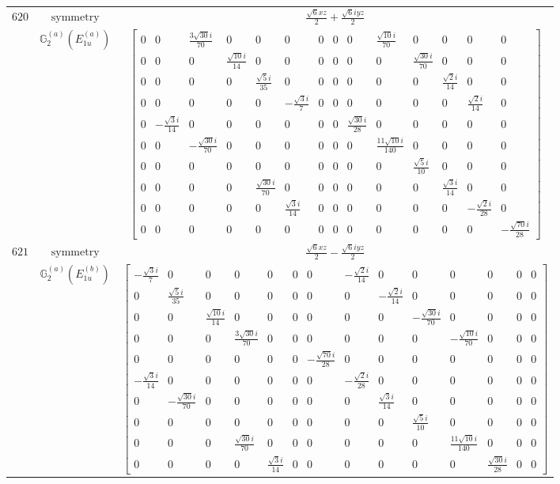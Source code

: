 \documentclass[fleqn,8pt,landscape]{jsarticle}
\begin{document}
\begin{longtable}{ccc}
$ 620 $ & $ \text{symmetry} $ & $ \frac{\sqrt{6} x z}{2} + \frac{\sqrt{6} i y z}{2} $ \\
$  $ & $ \mathbb{G}_{2}^{(a)}(E_{1u}^{(a)}) $ & $ \begin{bmatrix} 0 & 0 & \frac{3 \sqrt{30} i}{70} & 0 & 0 & 0 & 0 & 0 & 0 & \frac{\sqrt{10} i}{70} & 0 & 0 & 0 & 0 \\ 0 & 0 & 0 & \frac{\sqrt{10} i}{14} & 0 & 0 & 0 & 0 & 0 & 0 & \frac{\sqrt{30} i}{70} & 0 & 0 & 0 \\ 0 & 0 & 0 & 0 & \frac{\sqrt{5} i}{35} & 0 & 0 & 0 & 0 & 0 & 0 & \frac{\sqrt{2} i}{14} & 0 & 0 \\ 0 & 0 & 0 & 0 & 0 & - \frac{\sqrt{3} i}{7} & 0 & 0 & 0 & 0 & 0 & 0 & \frac{\sqrt{2} i}{14} & 0 \\ 0 & - \frac{\sqrt{3} i}{14} & 0 & 0 & 0 & 0 & 0 & 0 & \frac{\sqrt{30} i}{28} & 0 & 0 & 0 & 0 & 0 \\ 0 & 0 & - \frac{\sqrt{30} i}{70} & 0 & 0 & 0 & 0 & 0 & 0 & \frac{11 \sqrt{10} i}{140} & 0 & 0 & 0 & 0 \\ 0 & 0 & 0 & 0 & 0 & 0 & 0 & 0 & 0 & 0 & \frac{\sqrt{5} i}{10} & 0 & 0 & 0 \\ 0 & 0 & 0 & 0 & \frac{\sqrt{30} i}{70} & 0 & 0 & 0 & 0 & 0 & 0 & \frac{\sqrt{3} i}{14} & 0 & 0 \\ 0 & 0 & 0 & 0 & 0 & \frac{\sqrt{3} i}{14} & 0 & 0 & 0 & 0 & 0 & 0 & - \frac{\sqrt{2} i}{28} & 0 \\ 0 & 0 & 0 & 0 & 0 & 0 & 0 & 0 & 0 & 0 & 0 & 0 & 0 & - \frac{\sqrt{70} i}{28} \end{bmatrix} $ \\ \hline
$ 621 $ & $ \text{symmetry} $ & $ \frac{\sqrt{6} x z}{2} - \frac{\sqrt{6} i y z}{2} $ \\
$  $ & $ \mathbb{G}_{2}^{(a)}(E_{1u}^{(b)}) $ & $ \begin{bmatrix} - \frac{\sqrt{3} i}{7} & 0 & 0 & 0 & 0 & 0 & 0 & - \frac{\sqrt{2} i}{14} & 0 & 0 & 0 & 0 & 0 & 0 \\ 0 & \frac{\sqrt{5} i}{35} & 0 & 0 & 0 & 0 & 0 & 0 & - \frac{\sqrt{2} i}{14} & 0 & 0 & 0 & 0 & 0 \\ 0 & 0 & \frac{\sqrt{10} i}{14} & 0 & 0 & 0 & 0 & 0 & 0 & - \frac{\sqrt{30} i}{70} & 0 & 0 & 0 & 0 \\ 0 & 0 & 0 & \frac{3 \sqrt{30} i}{70} & 0 & 0 & 0 & 0 & 0 & 0 & - \frac{\sqrt{10} i}{70} & 0 & 0 & 0 \\ 0 & 0 & 0 & 0 & 0 & 0 & - \frac{\sqrt{70} i}{28} & 0 & 0 & 0 & 0 & 0 & 0 & 0 \\ - \frac{\sqrt{3} i}{14} & 0 & 0 & 0 & 0 & 0 & 0 & - \frac{\sqrt{2} i}{28} & 0 & 0 & 0 & 0 & 0 & 0 \\ 0 & - \frac{\sqrt{30} i}{70} & 0 & 0 & 0 & 0 & 0 & 0 & \frac{\sqrt{3} i}{14} & 0 & 0 & 0 & 0 & 0 \\ 0 & 0 & 0 & 0 & 0 & 0 & 0 & 0 & 0 & \frac{\sqrt{5} i}{10} & 0 & 0 & 0 & 0 \\ 0 & 0 & 0 & \frac{\sqrt{30} i}{70} & 0 & 0 & 0 & 0 & 0 & 0 & \frac{11 \sqrt{10} i}{140} & 0 & 0 & 0 \\ 0 & 0 & 0 & 0 & \frac{\sqrt{3} i}{14} & 0 & 0 & 0 & 0 & 0 & 0 & \frac{\sqrt{30} i}{28} & 0 & 0 \end{bmatrix} $ \\ \hline

\end{longtable}
\end{document}
